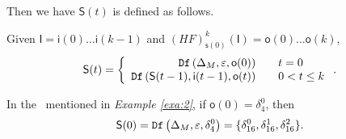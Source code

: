  Then we have $\mathsf{S}(t)$ is defined as follows. 
 \begin{definition}[$\mathsf{S}(t)$] Given $\mathsf{I}=\mathsf{i}(0)\ldots\mathsf{i}(k-1)$ and $(HF)^k_{\mathsf{s}(0)}(\mathsf{I})=\mathsf{o}(0)\ldots\mathsf{o}(k)$, %
	\[\mathsf{S}(t)=\left\{
\begin{array}{rcl}
{\tt Df}\left(\Delta_M,\varepsilon,\mathsf{o}(0)\right)      &      & {t=0}\\
{\tt Df}\left(\mathsf{S}(t-1),\mathsf{i}(t-1),\mathsf{o}(t)\right)       &      & 0<t\leq k
\end{array} \right. .\]

\end{definition}
\begin{example}
In the \BCN\ mentioned in {\em Example \ref{exa:2}}, if $\mathsf{o}(0)=\delta_4^0$, then \[\mathsf{S}(0)={\tt Df}\left(\Delta_M,\varepsilon,\delta_4^0\right)=\{\delta_{16}^0,\delta_{16}^1,\delta_{16}^2\}.\]
 \label{exa:8}
 \end{example}   
 

 
 

